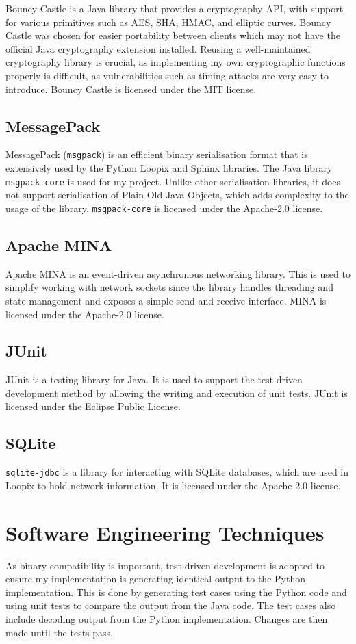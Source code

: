 \documentclass[final,dissertation.tex]{subfiles}
\begin{document}
Bouncy Castle is a Java library that provides a cryptography API, with support for various primitives such as AES, SHA, HMAC, and elliptic curves. Bouncy Castle was chosen for easier portability between clients which may not have the official Java cryptography extension installed. Reusing a well-maintained cryptography library is crucial, as implementing my own cryptographic functions properly is difficult, as vulnerabilities such as timing attacks are very easy to introduce. Bouncy Castle is licensed under the MIT license.

\subsection{MessagePack}

MessagePack (\verb|msgpack|) is an efficient binary serialisation format that is extensively used by the Python Loopix and Sphinx libraries. The Java library \verb|msgpack-core| is used for my project. Unlike other serialisation libraries, it does not support serialisation of Plain Old Java Objects, which adds complexity to the usage of the library. \verb|msgpack-core| is licensed under the Apache-2.0 license.

\subsection{Apache MINA}

Apache MINA is an event-driven asynchronous networking library. This is used to simplify working with network sockets since the library handles threading and state management and exposes a simple send and receive interface. MINA is licensed under the Apache-2.0 license.

\subsection{JUnit}

JUnit is a testing library for Java. It is used to support the test-driven development method by allowing the writing and execution of unit tests. JUnit is licensed under the Eclipse Public License.

\subsection{SQLite}

\verb|sqlite-jdbc| is a library for interacting with SQLite databases, which are used in Loopix to hold network information. It is licensed under the Apache-2.0 license.

\section{Software Engineering Techniques}

As binary compatibility is important, test-driven development is adopted to ensure my implementation is generating identical output to the Python implementation. This is done by generating test cases using the Python code and using unit tests to compare the output from the Java code. The test cases also include decoding output from the Python implementation. Changes are then made until the tests pass. 
\end{document}
